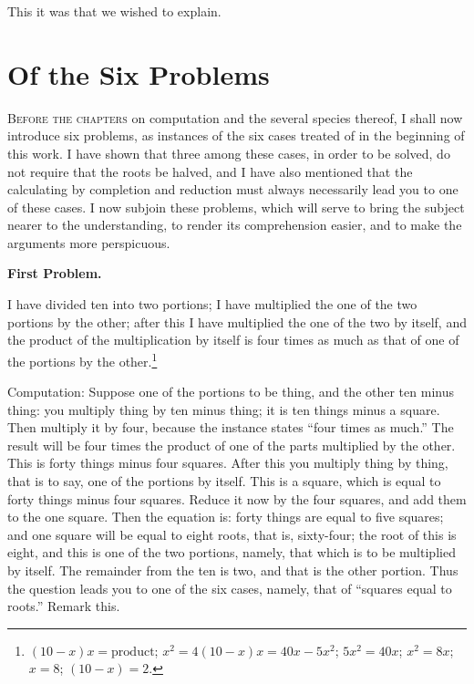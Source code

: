 This it was that we wished to explain.

\clearpage

\section*{Of the Six Problems}

\lettrine{B}{efore the chapters} on computation and the several species thereof, I shall now introduce six problems, as instances of the six cases treated of in the beginning of this work. I have shown that three among these cases, in order to be solved, do not require that the roots be halved, and I have also mentioned that the calculating by completion and reduction must always necessarily lead you to one of these cases. I now subjoin these problems, which will serve to bring the subject nearer to the understanding, to render its comprehension easier, and to make the arguments more perspicuous.

\vspace{0.3cm}
\noindent\textbf{First Problem.}

I have divided ten into two portions; I have multiplied the one of the two portions by the other; after this I have multiplied the one of the two by itself, and the product of the multiplication by itself is four times as much as that of one of the portions by the other.\footnote{$(10-x)x = \text{product}$; $x^2 = 4(10-x)x = 40x - 5x^2$; $5x^2 = 40x$; $x^2 = 8x$; $x = 8$; $(10-x) = 2$.}

Computation: Suppose one of the portions to be thing, and the other ten minus thing: you multiply thing by ten minus thing; it is ten things minus a square. Then multiply it by four, because the instance states ``four times as much.'' The result will be four times the product of one of the parts multiplied by the other. This is forty things minus four squares. After this you multiply thing by thing, that is to say, one of the portions by itself. This is a square, which is equal to forty things minus four squares. Reduce it now by the four squares, and add them to the one square. Then the equation is: forty things are equal to five squares; and one square will be equal to eight roots, that is, sixty-four; the root of this is eight, and this is one of the two portions, namely, that which is to be multiplied by itself. The remainder from the ten is two, and that is the other portion. Thus the question leads you to one of the six cases, namely, that of ``squares equal to roots.'' Remark this.

